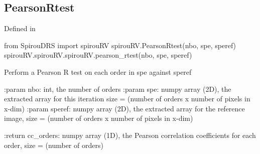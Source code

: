\noindent\begin{minipage}{\textwidth}
\subsection{PearsonRtest}

Defined in \spirouRV{}

\begin{pythonbox}
from SpirouDRS import spirouRV
spirouRV.PearsonRtest(nbo, spe, speref)
spirouRV.spirouRV.spirouRV.pearson_rtest(nbo, spe, speref)
\end{pythonbox}

\begin{pythondocstring}
Perform a Pearson R test on each order in spe against speref

:param nbo: int, the number of orders
:param spe: numpy array (2D), the extracted array for this iteration
            size = (number of orders x number of pixels in x-dim)
:param speref: numpy array (2D), the extracted array for the reference
               image, size = (number of orders x number of pixels in x-dim)

:return cc_orders: numpy array (1D), the Pearson correlation coefficients
                   for each order, size = (number of orders)
\end{pythondocstring}
\end{minipage}

